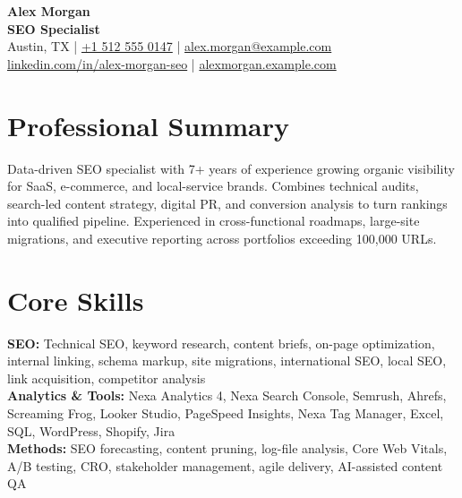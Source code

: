 \documentclass[10pt,a4paper]{article}
\begin{document}
\begin{center}
  {\Huge\bfseries Alex Morgan}\\[0.12em]
  {\large\color{accent}\bfseries SEO Specialist}\\[0.28em]
  Austin, TX \enspace\textcolor{muted}{|}\enspace
  \href{tel:+15125550147}{+1 512 555 0147} \enspace\textcolor{muted}{|}\enspace
  \href{mailto:alex.morgan@example.com}{alex.morgan@example.com}\\[0.12em]
  \href{https://www.linkedin.com/in/alex-morgan-seo}{linkedin.com/in/alex-morgan-seo}
  \enspace\textcolor{muted}{|}\enspace
  \href{https://alexmorgan.example.com}{alexmorgan.example.com}
\end{center}

\section*{Professional Summary}
Data-driven SEO specialist with 7+ years of experience growing organic visibility for SaaS, e-commerce, and local-service brands. Combines technical audits, search-led content strategy, digital PR, and conversion analysis to turn rankings into qualified pipeline. Experienced in cross-functional roadmaps, large-site migrations, and executive reporting across portfolios exceeding 100,000 URLs.

\section*{Core Skills}
\textbf{SEO:} Technical SEO, keyword research, content briefs, on-page optimization, internal linking, schema markup, site migrations, international SEO, local SEO, link acquisition, competitor analysis\\
\textbf{Analytics \& Tools:} Nexa Analytics 4, Nexa Search Console, Semrush, Ahrefs, Screaming Frog, Looker Studio, PageSpeed Insights, Nexa Tag Manager, Excel, SQL, WordPress, Shopify, Jira\\
\textbf{Methods:} SEO forecasting, content pruning, log-file analysis, Core Web Vitals, A/B testing, CRO, stakeholder management, agile delivery, AI-assisted content QA
\end{document}

